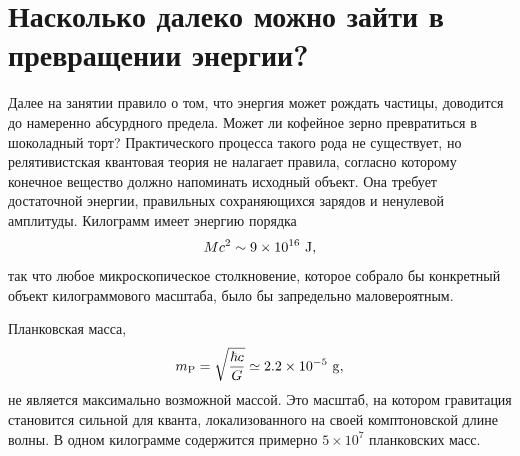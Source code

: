\begin{classroomqa}
\end{classroomqa}

\section{Насколько далеко можно зайти в превращении энергии?}

Далее на занятии правило о том, что энергия может рождать частицы, доводится до намеренно абсурдного предела. Может ли кофейное зерно превратиться в шоколадный торт? Практического процесса такого рода не существует, но релятивистская квантовая теория не налагает правила, согласно которому конечное вещество должно напоминать исходный объект. Она требует достаточной энергии, правильных сохраняющихся зарядов и ненулевой амплитуды. Килограмм имеет энергию порядка
\begin{equation}
  Mc^2\sim9\times10^{16}\ {\rm J},
\end{equation}
так что любое микроскопическое столкновение, которое собрало бы конкретный объект килограммового масштаба, было бы запредельно маловероятным.

Планковская масса,
\begin{equation}
  m_{\rm P}=\sqrt{\frac{\hbar c}{G}}
  \simeq2.2\times10^{-5}\ {\rm g},
\end{equation}
не является максимально возможной массой. Это масштаб, на котором гравитация становится сильной для кванта, локализованного на своей комптоновской длине волны. В одном килограмме содержится примерно \(5\times10^7\) планковских масс.

\begin{classroomqa}
\end{classroomqa}

